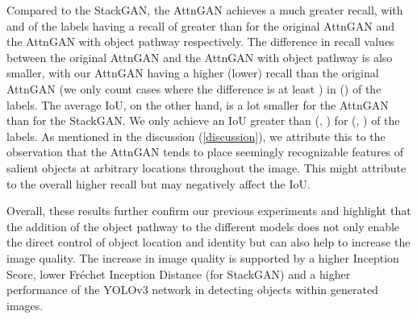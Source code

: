 \documentclass{article} \usepackage{iclr2019_conference,times}
\begin{document}
	Compared to the StackGAN, the AttnGAN achieves a much greater recall, with  and  of the labels having a recall of greater than  for the original AttnGAN and the AttnGAN with object pathway respectively.
	The difference in recall values between the original AttnGAN and the AttnGAN with object pathway is also smaller, with our AttnGAN having a higher (lower) recall than the original AttnGAN (we only count cases where the difference is at least ) in  () of the labels.
	The average IoU, on the other hand, is a lot smaller for the AttnGAN than for the StackGAN.
	We only achieve an IoU greater than  (, ) for  (, ) of the labels.
	As mentioned in the discussion (\autoref{discussion}), we attribute this to the observation that the AttnGAN tends to place seemingly recognizable features of salient objects at arbitrary locations throughout the image.
	This might attribute to the overall higher recall but may negatively affect the IoU.
	
	Overall, these results further confirm our previous experiments and highlight that the addition of the object pathway to the different models does not only enable the direct control of object location and identity but can also help to increase the image quality.
	The increase in image quality is supported by a higher Inception Score, lower Fr\'{e}chet Inception Distance (for StackGAN) and a higher performance of the YOLOv3 network in detecting objects within generated images.
	
\end{document}
